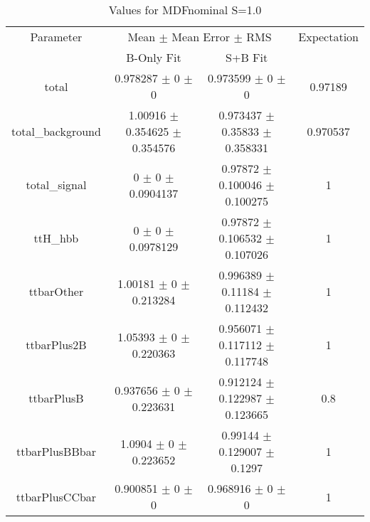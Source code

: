 \begin{table}
\centering
\caption{Values for MDFnominal S=1.0}
\begin{tabular}{cccc}
\toprule
Parameter & \multicolumn{2}{c}{Mean $\pm$ Mean Error $\pm$ RMS} & Expectation\\
 & B-Only Fit & S+B Fit & \\
\midrule
total & \num{0.978287} $\pm$ \num{0} $\pm$ \num{0} & \num{0.973599} $\pm$ \num{0} $\pm$ \num{0} & \num{0.97189}\\
total\_background & \num{1.00916} $\pm$ \num{0.354625} $\pm$ \num{0.354576} & \num{0.973437} $\pm$ \num{0.35833} $\pm$ \num{0.358331} & \num{0.970537}\\
total\_signal & \num{0} $\pm$ \num{0} $\pm$ \num{0.0904137} & \num{0.97872} $\pm$ \num{0.100046} $\pm$ \num{0.100275} & \num{1}\\
ttH\_hbb & \num{0} $\pm$ \num{0} $\pm$ \num{0.0978129} & \num{0.97872} $\pm$ \num{0.106532} $\pm$ \num{0.107026} & \num{1}\\
ttbarOther & \num{1.00181} $\pm$ \num{0} $\pm$ \num{0.213284} & \num{0.996389} $\pm$ \num{0.11184} $\pm$ \num{0.112432} & \num{1}\\
ttbarPlus2B & \num{1.05393} $\pm$ \num{0} $\pm$ \num{0.220363} & \num{0.956071} $\pm$ \num{0.117112} $\pm$ \num{0.117748} & \num{1}\\
ttbarPlusB & \num{0.937656} $\pm$ \num{0} $\pm$ \num{0.223631} & \num{0.912124} $\pm$ \num{0.122987} $\pm$ \num{0.123665} & \num{0.8}\\
ttbarPlusBBbar & \num{1.0904} $\pm$ \num{0} $\pm$ \num{0.223652} & \num{0.99144} $\pm$ \num{0.129007} $\pm$ \num{0.1297} & \num{1}\\
ttbarPlusCCbar & \num{0.900851} $\pm$ \num{0} $\pm$ \num{0} & \num{0.968916} $\pm$ \num{0} $\pm$ \num{0} & \num{1}\\
\bottomrule
\end{tabular}
\end{table}